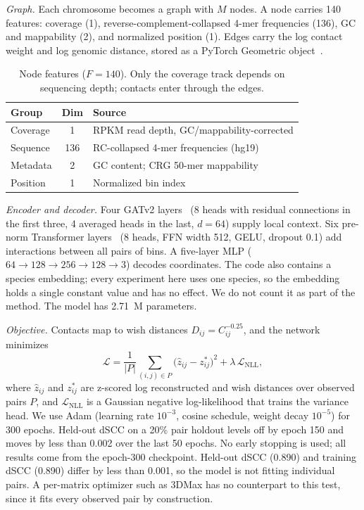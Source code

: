 \documentclass[conference]{IEEEtran}
\begin{document}
\textit{Graph.} Each chromosome becomes a graph with $M$ nodes. A node
carries 140 features: coverage (1), reverse-complement-collapsed 4-mer
frequencies (136), GC and mappability (2), and normalized position (1).
Edges carry the log contact weight and log genomic distance, stored as a
PyTorch Geometric object~\cite{pyg2019}.

\begin{table}[t]
\caption{Node features ($F=140$). Only the coverage track depends on
sequencing depth; contacts enter through the edges.}
\label{tab:features}
\centering
\begin{tabular}{@{}lcl@{}}
\toprule
Group & Dim & Source \\
\midrule
Coverage & 1 & RPKM read depth, GC/mappability-corrected \\
Sequence & 136 & RC-collapsed 4-mer frequencies (hg19) \\
Metadata & 2 & GC content; CRG 50-mer mappability \\
Position & 1 & Normalized bin index \\
\bottomrule
\end{tabular}
\end{table}

\textit{Encoder and decoder.} Four GATv2 layers~\cite{brody2022} (8 heads
with residual connections in the first three, 4 averaged heads in the
last, $d=64$) supply local context. Six pre-norm Transformer
layers~\cite{vaswani2017} (8 heads, FFN width 512, GELU, dropout 0.1)
add interactions between all pairs of bins. A five-layer MLP
($64\!\to\!128\!\to\!256\!\to\!128\!\to\!3$) decodes coordinates. The
code also contains a species embedding; every experiment here uses one
species, so the embedding holds a single constant value and has no
effect. We do not count it as part of the method. The model has 2.71~M
parameters.

\textit{Objective.} Contacts map to wish distances
$D_{ij}=C_{ij}^{-0.25}$, and the network minimizes
\begin{equation}
\mathcal{L}=\frac{1}{|P|}\sum_{(i,j)\in P}\big(\hat z_{ij}-z^{*}_{ij}\big)^2
+\lambda\,\mathcal{L}_{\mathrm{NLL}},
\end{equation}
where $\hat z_{ij}$ and $z^{*}_{ij}$ are z-scored log reconstructed and
wish distances over observed pairs $P$, and $\mathcal{L}_{\mathrm{NLL}}$
is a Gaussian negative log-likelihood that trains the variance head. We
use Adam (learning rate $10^{-3}$, cosine schedule, weight decay
$10^{-5}$) for 300 epochs. Held-out dSCC on a 20\% pair holdout levels
off by epoch 150 and moves by less than 0.002 over the last 50 epochs.
No early stopping is used; all results come from the epoch-300
checkpoint. Held-out dSCC (0.890) and training dSCC (0.890) differ by
less than 0.001, so the model is not fitting individual pairs. A
per-matrix optimizer such as 3DMax has no counterpart to this test,
since it fits every observed pair by construction.
\end{document}
